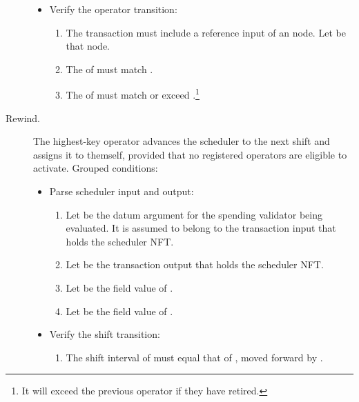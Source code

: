 \documentclass[../midgard.tex]{subfiles}
\begin{document}
\begin{description}
\begin{itemize}
            \item Verify the operator transition:
            \begin{enumerate}[resume]
                \item The transaction must include a reference input of an  node. Let  be that node.
                \item The  of  must match .
                \item The  of  must match or exceed .\footnote{It will exceed the previous operator if they have retired.}
            \end{enumerate}
        \end{itemize}

       \item[Rewind.] The highest-key operator advances the scheduler to the next shift and assigns it to themself, provided that no registered operators are eligible to activate. Grouped conditions:
        \begin{itemize}
            \item Parse scheduler input and output:
            \begin{enumerate}
                \item Let  be the datum argument for the spending validator being evaluated. It is assumed to belong to the transaction input that holds the scheduler NFT.
                \item Let  be the transaction output that holds the scheduler NFT.
                \item Let  be the  field value of .
                \item Let  be the  field value of .
            \end{enumerate}
            \item Verify the shift transition:
            \begin{enumerate}[resume]
                \item The shift interval of  must equal that of , moved forward by .
            \end{enumerate}
            

\end{itemize}
\end{description}
\end{document}
